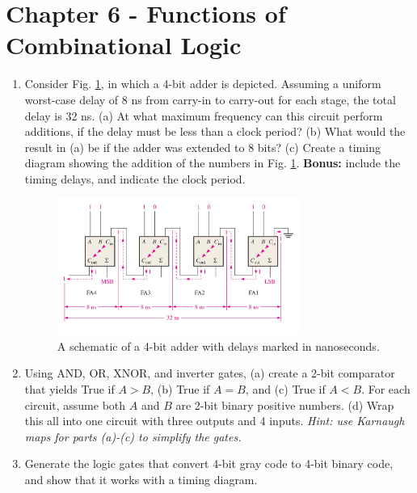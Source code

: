 \documentclass[10pt]{article}
\begin{document}
\maketitle

\section{Chapter 6 - Functions of Combinational Logic}
\label{sec:comb2}

\begin{enumerate}
\item Consider Fig. \ref{fig:4bit_wDelay}, in which a 4-bit adder is depicted.  Assuming a uniform worst-case delay of 8 ns from carry-in to carry-out for each stage, the total delay is 32 ns.  (a) At what maximum frequency can this circuit perform additions, if the delay must be less than a clock period? (b) What would the result in (a) be if the adder was extended to 8 bits? (c) Create a timing diagram showing the addition of the numbers in Fig. \ref{fig:4bit_wDelay}. \textbf{Bonus:} include the timing delays, and indicate the clock period.
\begin{figure}[ht]
\centering
\includegraphics[width=0.75\textwidth]{figures/4bitadder_withDelay.pdf}
\caption{\label{fig:4bit_wDelay} A schematic of a 4-bit adder with delays marked in nanoseconds.}
\end{figure}
\item Using AND, OR, XNOR, and inverter gates, (a) create a 2-bit comparator that yields True if $A > B$, (b) True if $A = B$, and (c) True if $A < B$.  For each circuit, assume both $A$ and $B$ are 2-bit binary positive numbers. (d) Wrap this all into one circuit with three outputs and 4 inputs.  \textit{Hint: use Karnaugh maps for parts (a)-(c) to simplify the gates.} \\ \vspace{3.5cm}
\item Generate the logic gates that convert 4-bit gray code to 4-bit binary code, and show that it works with a timing diagram. \\ \vspace{3cm}

\end{enumerate}
\end{document}

